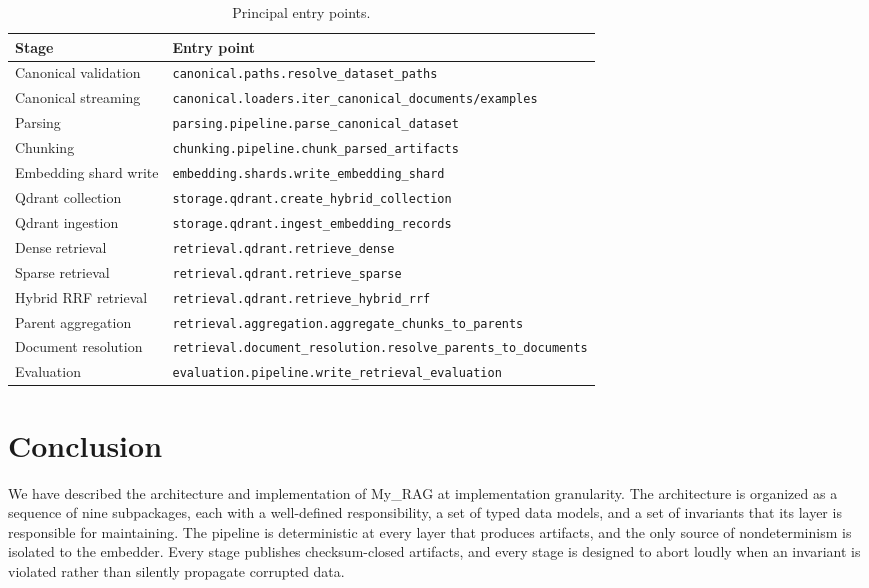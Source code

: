 \documentclass[11pt,a4paper]{article}
\begin{document}
\begin{table}[h]
\centering
\caption{Principal entry points.}
\label{tab:entrypoints}
\small
\begin{tabular}{l l}
\toprule
\textbf{Stage} & \textbf{Entry point} \\
\midrule
Canonical validation & \texttt{canonical.paths.resolve\_dataset\_paths} \\
Canonical streaming & \texttt{canonical.loaders.iter\_canonical\_documents/examples} \\
Parsing & \texttt{parsing.pipeline.parse\_canonical\_dataset} \\
Chunking & \texttt{chunking.pipeline.chunk\_parsed\_artifacts} \\
Embedding shard write & \texttt{embedding.shards.write\_embedding\_shard} \\
Qdrant collection & \texttt{storage.qdrant.create\_hybrid\_collection} \\
Qdrant ingestion & \texttt{storage.qdrant.ingest\_embedding\_records} \\
Dense retrieval & \texttt{retrieval.qdrant.retrieve\_dense} \\
Sparse retrieval & \texttt{retrieval.qdrant.retrieve\_sparse} \\
Hybrid RRF retrieval & \texttt{retrieval.qdrant.retrieve\_hybrid\_rrf} \\
Parent aggregation & \texttt{retrieval.aggregation.aggregate\_chunks\_to\_parents} \\
Document resolution & \texttt{retrieval.document\_resolution.resolve\_parents\_to\_documents} \\
Evaluation & \texttt{evaluation.pipeline.write\_retrieval\_evaluation} \\
\bottomrule
\end{tabular}
\end{table}

\section{Conclusion}

We have described the architecture and implementation of My\_RAG at
implementation granularity. The architecture is organized as a
sequence of nine subpackages, each with a well-defined
responsibility, a set of typed data models, and a set of invariants
that its layer is responsible for maintaining. The pipeline is
deterministic at every layer that produces artifacts, and the only
source of nondeterminism is isolated to the embedder. Every stage
publishes checksum-closed artifacts, and every stage is designed to
abort loudly when an invariant is violated rather than silently
propagate corrupted data.
\end{document}

